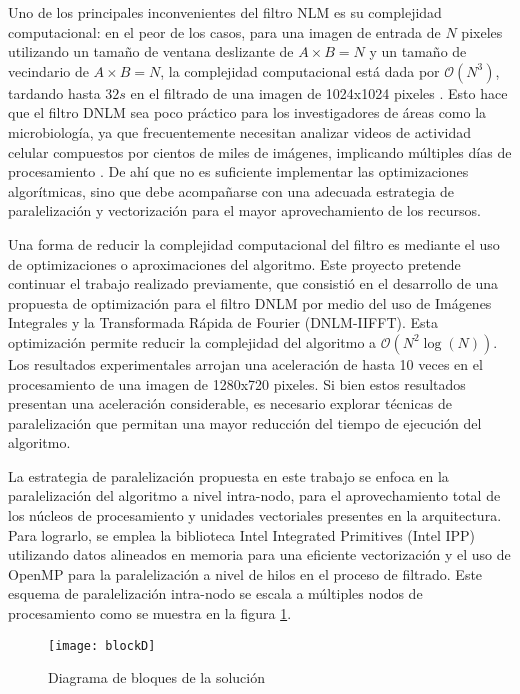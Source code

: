 Uno de los principales inconvenientes del filtro NLM es su complejidad computacional: en el peor de los casos, para una imagen de entrada de $N$ pixeles utilizando un tamaño de ventana deslizante de $A\times B = N$ y un tamaño de vecindario de $A\times B = N$, la complejidad computacional est\'a dada por $\mathcal{O}(N^{3})$, tardando hasta $32s$ en el filtrado de una imagen de 1024x1024 pixeles \cite{Zhu2016}. Esto hace que el filtro DNLM sea poco pr\'actico para los investigadores de \'areas como la microbiolog\'ia, ya que frecuentemente necesitan analizar videos de actividad celular compuestos por cientos de miles de im\'agenes, implicando m\'ultiples d\'ias de procesamiento  \cite{Yang2006NucleiSU, cellsegmentationMarkov, Tay2010, Fils_BfilCells_2008}. De ah\'i que no es suficiente implementar las optimizaciones algor\'itmicas, sino que debe acompa\~narse con una adecuada estrategia de paralelizaci\'on y vectorizaci\'on para el mayor aprovechamiento de los recursos.

Una forma de reducir la complejidad computacional del filtro es mediante el uso de optimizaciones o aproximaciones del algoritmo. Este proyecto pretende continuar el trabajo realizado previamente, que consisti\'o en el desarrollo de una propuesta de optimizaci\'on para el filtro DNLM por medio del uso de Im\'agenes Integrales y la Transformada R\'apida de Fourier (DNLM-IIFFT). Esta optimizaci\'on permite reducir la complejidad del algoritmo a  $\mathcal{O}(N^{2}\log(N))$. Los resultados experimentales arrojan una aceleraci\'on de hasta 10 veces en el procesamiento de una imagen de 1280x720 pixeles. Si bien estos resultados presentan una aceleraci\'on considerable, es necesario explorar t\'ecnicas de paralelizaci\'on que permitan una mayor reducci\'on del tiempo de ejecuci\'on del algoritmo. 

La estrategia de paralelizaci\'on propuesta en este trabajo se enfoca en la paralelizaci\'on del algoritmo a nivel intra-nodo, para el aprovechamiento total de los n\'ucleos de procesamiento y unidades vectoriales presentes en la arquitectura. Para lograrlo, se emplea la biblioteca Intel Integrated Primitives (Intel IPP) utilizando datos alineados en memoria para una eficiente vectorizaci\'on y el uso de OpenMP para la paralelizaci\'on a nivel de hilos en el proceso de filtrado. Este esquema de paralelizaci\'on intra-nodo se escala a m\'ultiples nodos de procesamiento como se muestra en la figura \ref{fig:diagram1}.


\begin{figure}[H]
  \centering
  \texttt{[image: blockD]}
  \caption{Diagrama de bloques de la soluci\'on}
  \label{fig:diagram1}
\end{figure}

